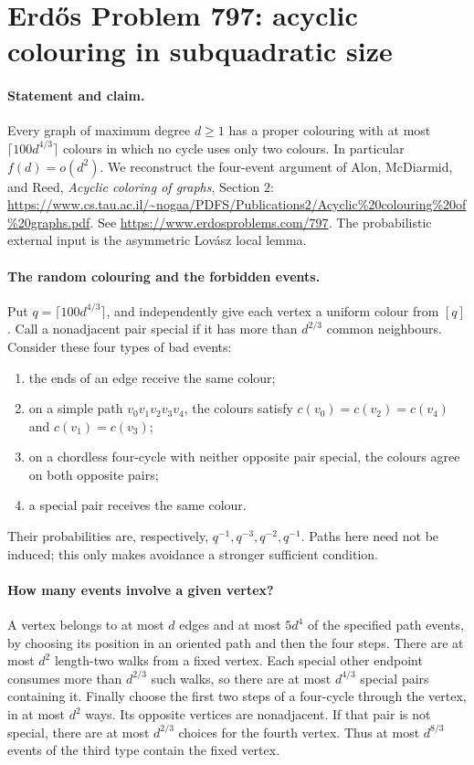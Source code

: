 \section*{Erd\H{o}s Problem 797: acyclic colouring in subquadratic size}

\paragraph{Statement and claim.}
Every graph of maximum degree \(d\geq1\) has a proper colouring
with at most \(\lceil100d^{4/3}\rceil\) colours in which no cycle
uses only two colours. In particular \(f(d)=o(d^2)\).
We reconstruct the four-event argument of Alon, McDiarmid,
and Reed, \emph{Acyclic coloring of graphs}, Section 2:
\url{https://www.cs.tau.ac.il/~nogaa/PDFS/Publications2/Acyclic%20colouring%20of%20graphs.pdf}.
See \url{https://www.erdosproblems.com/797}.
The probabilistic external input is the asymmetric
Lov\'asz local lemma.

\paragraph{The random colouring and the forbidden events.}
Put \(q=\lceil100d^{4/3}\rceil\), and independently give each
vertex a uniform colour from \([q]\).
Call a nonadjacent pair special if it has more than
\(d^{2/3}\) common neighbours.
Consider these four types of bad events:
\begin{enumerate}
\item the ends of an edge receive the same colour;
\item on a simple path \(v_0v_1v_2v_3v_4\), the colours satisfy
\(c(v_0)=c(v_2)=c(v_4)\) and \(c(v_1)=c(v_3)\);
\item on a chordless four-cycle with neither opposite pair special,
the colours agree on both opposite pairs;
\item a special pair receives the same colour.
\end{enumerate}
Their probabilities are, respectively,
\(q^{-1},q^{-3},q^{-2},q^{-1}\).
Paths here need not be induced; this only makes avoidance
a stronger sufficient condition.

\paragraph{How many events involve a given vertex?}
A vertex belongs to at most \(d\) edges and at most
\(5d^4\) of the specified path events, by choosing its
position in an oriented path and then the four steps.
There are at most \(d^2\) length-two walks from a fixed
vertex. Each special other endpoint consumes more than
\(d^{2/3}\) such walks, so there are at most \(d^{4/3}\)
special pairs containing it.
Finally choose the first two steps of a four-cycle through
the vertex, in at most \(d^2\) ways.
Its opposite vertices are nonadjacent. If that pair is not
special, there are at most
\(d^{2/3}\) choices for the fourth vertex.
Thus at most \(d^{8/3}\) events of the third type contain
the fixed vertex.

